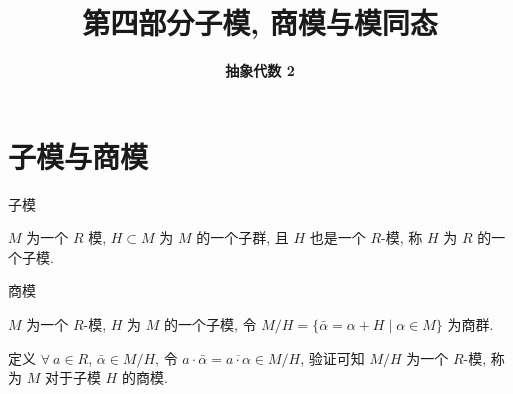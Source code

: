 \everymath{\displaystyle}



\title[第四部分\\
子模, 商模与模同态]{\texorpdfstring{\LARGE \bfseries 第四部分\quad 子模, 商模与模同态}{第四部分 子模, 商模与模同态}}
\author[抽象代数 2]{\Large \bfseries 抽象代数 2}
\date{}





\begin{frame}

\titlepage %

\end{frame}


\section[子模与商模]{子模与商模}


\begin{frame}{子模}

\begin{Def}[子模]
$M$ 为一个 $R$ 模, $H \subset M$ 为 $M$ 的一个子群, 且 $H$ 也是一个 $R$-模,
称 $H$ 为 $R$ 的一个子模.
\end{Def}

\end{frame}


\begin{frame}{商模}

$M$ 为一个 $R$-模, $H$ 为 $M$ 的一个子模,
令 $M/H = \big\{ \bar{\alpha} = \alpha + H \;\big|\; \alpha \in M \big\}$ 为商群.

\begin{Def}[商模]
定义 $\forall\ a \in R$, $\bar{\alpha} \in M/H$, 令
$a \cdot \bar{\alpha} = \overline{a \cdot \alpha} \in M/H$,
验证可知 $M/H$ 为一个 $R$-模, 称为 $M$ 对于子模 $H$ 的\alert{商模}.
\end{Def}

\end{frame}


